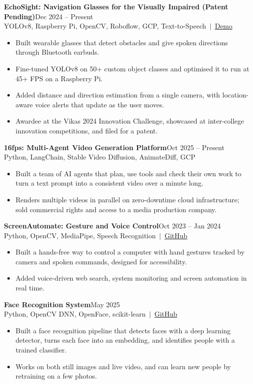 \documentclass[a4paper,10pt]{article}
\newcommand{\project}[3]{\textbf{#1}\hfill #2\\{\small #3}\par\vspace{-2pt}}
\newcommand{\gap}{\vspace{5pt}}
\begin{document}
\project{EchoSight: Navigation Glasses for the Visually Impaired (Patent Pending)}{Dec 2024 -- Present}{YOLOv8, Raspberry Pi, OpenCV, Roboflow, GCP, Text-to-Speech \,$|$\, \href{https://drive.google.com/file/d/1r_dGlaLp-_ueKEicPEHzzcnC8IBGrJQT/view?usp=sharing}{Demo}}
\begin{itemize}
  \item Built wearable glasses that detect obstacles and give spoken directions through Bluetooth earbuds.
  \item Fine-tuned YOLOv8 on 50+ custom object classes and optimised it to run at 45+ FPS on a Raspberry Pi.
  \item Added distance and direction estimation from a single camera, with location-aware voice alerts that update as the user moves.
  \item Awardee at the Vikas 2024 Innovation Challenge, showcased at inter-college innovation competitions, and filed for a patent.
\end{itemize}
\gap

\project{16fps: Multi-Agent Video Generation Platform}{Oct 2025 -- Present}{Python, LangChain, Stable Video Diffusion, AnimateDiff, GCP}
\begin{itemize}
  \item Built a team of AI agents that plan, use tools and check their own work to turn a text prompt into a consistent video over a minute long.
  \item Renders multiple videos in parallel on zero-downtime cloud infrastructure; sold commercial rights and access to a media production company.
\end{itemize}
\gap

\project{ScreenAutomate: Gesture and Voice Control}{Oct 2023 -- Jan 2024}{Python, OpenCV, MediaPipe, Speech Recognition \,$|$\, \href{https://github.com/nithin434/Screen-Automate}{GitHub}}
\begin{itemize}
  \item Built a hands-free way to control a computer with hand gestures tracked by camera and spoken commands, designed for accessibility.
  \item Added voice-driven web search, system monitoring and screen automation in real time.
\end{itemize}
\gap

\project{Face Recognition System}{May 2025}{Python, OpenCV DNN, OpenFace, scikit-learn \,$|$\, \href{https://github.com/nithin434/face_recog_AP}{GitHub}}
\begin{itemize}
  \item Built a face recognition pipeline that detects faces with a deep learning detector, turns each face into an embedding, and identifies people with a trained classifier.
  \item Works on both still images and live video, and can learn new people by retraining on a few photos.
\end{itemize}
\gap
\end{document}

